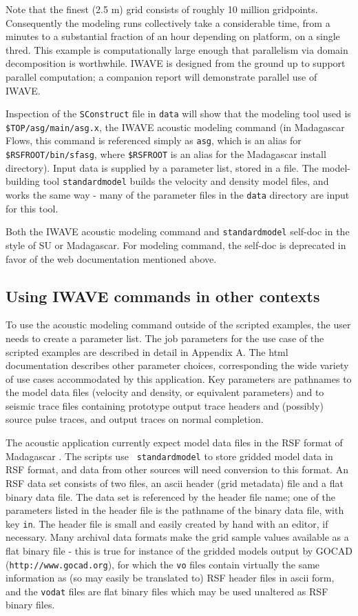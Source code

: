 Note that the finest (2.5 m) grid consists of roughly 10 million
gridpoints. Consequently the modeling runs collectively take a
considerable time, from a minutes to a substantial fraction of an hour
depending on platform,
on a single thred. This example is computationally large enough that
parallelism via domain decomposition is worthwhile. IWAVE is designed
from the ground up to support parallel computation; a companion report
will demonstrate parallel use of IWAVE.

Inspection of the {\tt SConstruct} file in {\tt data} will show that
the modeling tool used is {\tt \$TOP/asg/main/asg.x}, the IWAVE
acoustic modeling command (in Madagascar Flows, this command is referenced
simply as {\tt asg}, which is an alias for {\tt \$RSFROOT/bin/sfasg},
where {\tt \$RSFROOT} is an alias for the Madagascar install
directory). Input data is supplied by a parameter list, stored in a file.
The model-building tool {\tt standardmodel} builds the velocity and
density model files, and works the same way - many of the parameter
files in the {\tt data} directory are input for this tool.

Both the IWAVE acoustic modeling command and {\tt standardmodel}
self-doc in the style of SU or Madagascar. For modeling command, the
self-doc is deprecated in favor of the web documentation mentioned
above.

\subsection{Using IWAVE commands in other contexts}
To use the acoustic modeling command outside of the scripted examples,
the user needs to create a parameter list.  The job parameters for the
use case of the scripted examples are described in detail in Appendix
A. The html documentation \cite[]{IWAVE} describes other parameter
choices, corresponding the wide variety of use cases accommodated by
this application. Key parameters are pathnames to the model data files
(velocity and density, or equivalent parameters) and to seismic trace
files containing prototype output trace headers and (possibly) source
pulse traces, and output traces on normal completion.

The acoustic application currently expect model data files in the RSF
format of Madagascar \cite[]{Madagascar}. The scripts use {\tt
  standardmodel} to store gridded model data in RSF format, and data
from other sources will need conversion to this format. An RSF data
set consists of two files, an ascii header (grid metadata) file and a
flat binary data file. The data set is referenced by the header file
name; one of the parameters listed in the header file is the pathname
of the binary data file, with key {\tt in}. The header file is small
and easily created by hand with an editor, if necessary. Many archival
data formats make the grid sample values available as a flat binary
file - this is true for instance of the gridded models output by GOCAD
({\tt http://www.gocad.org}), for which the {\tt vo} files contain virtually
the same information as (so may easily be translated to) RSF header
files in ascii form, and the {\tt vodat} files are flat binary files
which may be used unaltered as RSF binary files.

